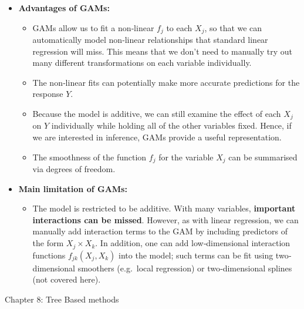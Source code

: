 \documentclass{article}
\begin{document}
\begin{itemize}
  \item \textbf{Advantages of GAMs:}
    \begin{itemize}
      \item GAMs allow us to fit a non‐linear \(f_j\) to each \(X_j\), so that we can automatically model non‐linear relationships that standard linear regression will miss. This means that we don’t need to manually try out many different transformations on each variable individually.
      \item The non‐linear fits can potentially make more accurate predictions for the response \(Y\).
      \item Because the model is additive, we can still examine the effect of each \(X_j\) on \(Y\) individually while holding all of the other variables fixed. Hence, if we are interested in inference, GAMs provide a useful representation.
      \item The smoothness of the function \(f_j\) for the variable \(X_j\) can be summarised via degrees of freedom.
    \end{itemize}

  \item \textbf{Main limitation of GAMs:}
    \begin{itemize}
      \item The model is restricted to be additive. With many variables, \textbf{important interactions can be missed}. However, as with linear regression, we can manually add interaction terms to the GAM by including predictors of the form \(X_j \times X_k\). In addition, one can add low‐dimensional interaction functions \(f_{jk}(X_j, X_k)\) into the model; such terms can be fit using two‐dimensional smoothers (e.g.\ local regression) or two‐dimensional splines (not covered here).
    \end{itemize}
\end{itemize}

\newpage

\begin{center}
    \Large{Chapter 8: Tree Based methods}
\end{center}
\end{document}
